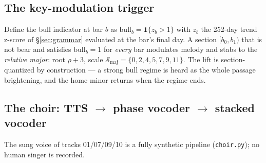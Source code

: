 \documentclass[11pt,a4paper]{article}
\newcommand{\ind}{\mathbf{1}}
\begin{document}
\subsection{The key-modulation trigger}\label{sec:v4key}

Define the bull indicator at bar $b$ as $\mathrm{bull}_b = \ind\{z_b > 1\}$
with $z_b$ the 252-day trend z-score of \S\ref{sec:grammar} evaluated at the
bar's final day. A section $[b_0, b_1)$ that is not \textsf{bear} and
satisfies $\mathrm{bull}_b = 1$ for \emph{every} bar modulates melody and
stabs to the \emph{relative major}: root $\rho + 3$, scale
$\mathcal S_{\mathrm{maj}} = \{0,2,4,5,7,9,11\}$. The lift is
section-quantized by construction --- a strong bull regime is heard as the
whole passage brightening, and the home minor returns when the regime ends.

\subsection{The choir: TTS $\to$ phase vocoder $\to$ stacked vocoder}\label{sec:v4choir}

The sung voice of tracks 01/07/09/10 is a fully synthetic pipeline
(\texttt{choir.py}); no human singer is recorded.
\end{document}
